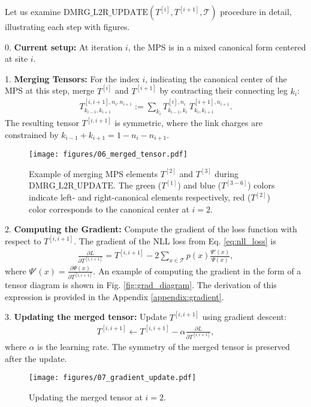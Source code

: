Let us examine $\text{DMRG\_L2R\_UPDATE}\left(T^{[i]}, T^{[i+1]}, \mathcal{T}\right)$ procedure in detail, illustrating each step with figures. 

0. \textbf{Current setup:} At iteration $i$, the MPS is in a mixed canonical form centered at site $i$.

1. \textbf{Merging Tensors:}
   For the index $i$, indicating the canonical center of the MPS at this step, merge $T^{[i]}$ and $T^{[i+1]}$ by contracting their connecting leg $k_{i}$:
   \begin{align}
       T^{[i, i+1], n_i, n_{i+1}}_{k_{i-1}, k_{i+1}} := \sum_{k_{i}} T^{[i], n_i}_{k_{i-1}, k_{i}} \, T^{[i+1], n_{i+1}}_{k_{i}, k_{i+1}}.
   \end{align} 
The resulting tensor $T^{[i, i+1]}$ is symmetric, where the link charges are constrained by  $k_{i-1} + k_{i+1} = 1 - n_i - n_{i+1}$. 

   \begin{figure}[ht]
       \centering
       \texttt{[image: figures/06\_merged\_tensor.pdf]}
       \caption{Example of merging MPS elements $T^{[2]}$ and $T^{[3]}$ during $\text{DMRG\_L2R\_UPDATE}$. The green ($T^{[1]}$) and blue ($T^{[3-6]}$) colors indicate left- and right-canonical elements respectively, red ($T^{[2]}$) color corresponds to the canonical center at $i=2$.}
       \label{fig:merge_mps}
   \end{figure}

2. \textbf{Computing the Gradient:}
   Compute the gradient of the loss function with respect to $T^{[i, i+1]}$. The gradient of the NLL loss from Eq. \eqref{eq:nll_loss} is
   \begin{align}
       \frac{\partial L}{\partial T^{[i, i+1]}} = T^{[i, i+1]} - 2 \sum_{x \in \mathcal{T}} p(x) \frac{\Psi'(x)}{\Psi(x)},
    \label{eq:dLdM}
   \end{align}
   where $\Psi'(x) = \frac{\partial \Psi(x)}{\partial T^{[i, i+1]}}$. An example of computing the gradient in the form of a tensor diagram is shown in Fig. \ref{fig:grad_diagram}. The derivation of this expression is provided in the Appendix \ref{appendix:gradient}. 

3. \textbf{Updating the merged tensor:}
   Update $T^{[i, i+1]}$ using gradient descent:
   \begin{align}
       T^{[i, i+1]} \leftarrow T^{[i, i+1]} - \alpha \frac{\partial L}{\partial T^{[i, i+1]}},
   \end{align}
   where $\alpha$ is the learning rate. The symmetry of the merged tensor is preserved after the update.
   \begin{figure}[ht]
       \centering
       \texttt{[image: figures/07\_gradient\_update.pdf]}
       \caption{Updating the merged tensor at $i=2$.}
       \label{fig:grad_update}
   \end{figure}

